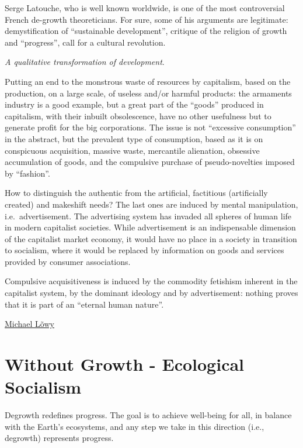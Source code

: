 \documentclass[
]{book}
\begin{document}
Serge Latouche, who is well known worldwide, is one of the most controversial French de-growth theoreticians. For sure, some of his arguments are legitimate: demystification of ``sustainable development'', critique of the religion of growth and ``progress'', call for a cultural revolution.

\emph{A qualitative transformation of development}.

Putting an end to the monstrous waste of resources by capitalism, based on the production, on a large scale, of useless and/or harmful products: the armaments industry is a good example, but a great part of the ``goods'' produced in capitalism, with their inbuilt obsolescence, have no other usefulness but to generate profit for the big corporations. The issue is not ``excessive consumption'' in the abstract, but the prevalent type of consumption, based as it is on conspicuous acquisition, massive waste, mercantile alienation, obsessive accumulation of goods, and the compulsive purchase of pseudo-novelties imposed by ``fashion''.

How to distinguish the authentic from the artificial, factitious (artificially created) and makeshift needs? The last ones are induced by mental manipulation, i.e.~advertisement. The advertising system has invaded all spheres of human life in modern capitalist societies.
While advertisement is an indispensable dimension of the capitalist market economy, it would have no place in a society in transition to socialism, where it would be replaced by information on goods and services provided by consumer associations.

Compulsive acquisitiveness is induced by the commodity fetishism inherent in the capitalist system, by the dominant ideology and by advertisement: nothing proves that it is part of an ``eternal human nature''.

\href{https://www.letusrise.ie/rupture-articles/2wl71srdonxrbgxal9v6bv78njr2fb}{Michael Lõwy}

\hypertarget{without-growth---ecological-socialism}{%
\section{Without Growth - Ecological Socialism}\label{without-growth---ecological-socialism}}

Degrowth redefines progress.
The goal is to achieve well-being for all,
in balance with the Earth's ecosystems,
and any step we take in this direction (i.e., degrowth) represents progress.
\end{document}
